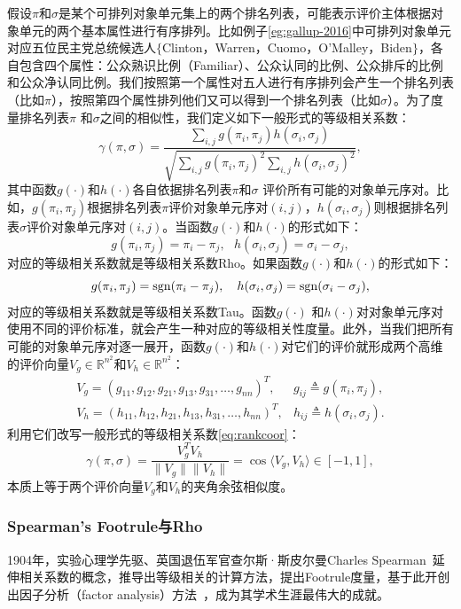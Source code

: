 假设$\pi$和$\sigma$是某个可排列对象单元集上的两个排名列表，可能表示评价主体根据对象单元的两个基本属性进行有序排列。比如例子\ref{eg:gallup-2016}中可排列对象单元对应五位民主党总统候选人$\big\{$Clinton，Warren，Cuomo，O'Malley，Biden$\big\}$，各自包含四个属性：公众熟识比例（Familiar）、公众认同的比例、公众排斥的比例和公众净认同比例。我们按照第一个属性对五人进行有序排列会产生一个排名列表（比如$\pi$），按照第四个属性排列他们又可以得到一个排名列表（比如$\sigma$）。为了度量排名列表$\pi$ 和$\sigma$之间的相似性，我们定义如下一般形式的等级相关系数：
\begin{equation}\label{eq:rankcoor}
    \gamma(\pi, \sigma) = \frac{\sum\limits_{i,j} g(\pi_i,\pi_j)h(\sigma_i,\sigma_j)}{\sqrt{\sum\limits_{i,j} g(\pi_i,\pi_j)^2 \sum\limits_{i,j} h(\sigma_i,\sigma_j)^2}},
\end{equation}
其中函数$g(\cdot)$和$h(\cdot)$各自依据排名列表$\pi$和$\sigma$ 评价所有可能的对象单元序对。比如，$g(\pi_i,\pi_j)$根据排名列表$\pi$评价对象单元序对$(i,j)$，$h(\sigma_i,\sigma_j)$则根据排名列表$\sigma$评价对象单元序对$(i,j)$。当函数$g(\cdot)$和$h(\cdot)$的形式如下：
\[
    g(\pi_i,\pi_j)  = \pi_i - \pi_j, ~~~ h(\sigma_i,\sigma_j)  = \sigma_i - \sigma_j,
\]
对应的等级相关系数就是等级相关系数Rho。如果函数$g(\cdot)$和$h(\cdot)$的形式如下：
\[
    g(\pi_i,\pi_j)  =  \operatorname{\mathrm{sgn}}(\pi_i - \pi_j),~~~ h(\sigma_i,\sigma_j)  =  \operatorname{\mathrm{sgn}}(\sigma_i - \sigma_j),
\]
对应的等级相关系数就是等级相关系数Tau。函数$g(\cdot)$ 和$h(\cdot)$对对象单元序对使用不同的评价标准，就会产生一种对应的等级相关性度量。此外，当我们把所有可能的对象单元序对逐一展开，函数$g(\cdot)$和$h(\cdot)$对它们的评价就形成两个高维的评价向量$V_g\in \mathbb R^{n^2}$和$V_h\in \mathbb R^{n^2}$：
\begin{eqnarray}
  V_g = (g_{11}, g_{12}, g_{21}, g_{13}, g_{31}, \ldots, g_{nn})^T, & g_{ij} \triangleq g(\pi_i,\pi_j),\\
  V_h = (h_{11}, h_{12}, h_{21}, h_{13}, h_{31}, \ldots, h_{nn})^T, & h_{ij} \triangleq h(\sigma_i,\sigma_j).
\end{eqnarray}
利用它们改写一般形式的等级相关系数\eqref{eq:rankcoor}：
\begin{equation}
    \gamma(\pi, \sigma) = \frac{V_g^T V_h}{\|V_g\|\|V_h\|} = \cos \langle V_g, V_h \rangle \in [-1, 1],
\end{equation}
本质上等于两个评价向量$V_g$和$V_h$的夹角余弦相似度。

\subsubsection{Spearman's Footrule与Rho}
1904年，实验心理学先驱、英国退伍军官查尔斯·斯皮尔曼Charles Spearman~\cite{spearman1904proof}延伸相关系数的概念，推导出等级相关的计算方法，提出Footrule度量，基于此开创出因子分析（factor analysis）方法~\cite{spearman1904general}，成为其学术生涯最伟大的成就。

